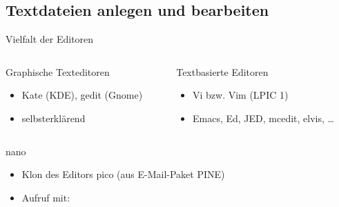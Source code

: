 \documentclass[aspectratio=43]{beamer}
\begin{document}
\subsection{Textdateien anlegen und bearbeiten}
\begin{frame}{Vielfalt der Editoren}
  \begin{columns}
    \begin{column}{.5\textwidth}
        \begin{block}{Graphische Texteditoren}
    \begin{itemize}
      \item Kate (KDE), gedit (Gnome)
      \item selbsterklärend
    \end{itemize}
  \end{block}
    \end{column}
    \begin{column}{.5\textwidth}
      \begin{block}{Textbasierte Editoren}
        \begin{itemize}
          \item Vi bzw. Vim (LPIC 1)
          \item Emacs, Ed, JED, mcedit, elvis, \dots 
        \end{itemize}
      \end{block}
    \end{column}
  \end{columns}
  \begin{block}{nano}
    \begin{itemize}
      \item Klon des Editors pico (aus E-Mail-Paket PINE)
      \item Aufruf mit:\\
    \end{itemize}
  \end{block}
\end{frame}
\end{document}
